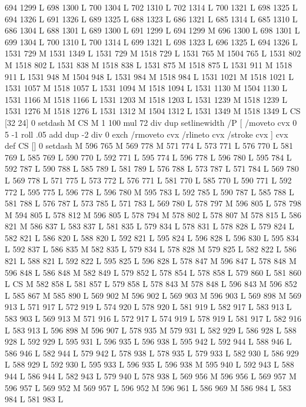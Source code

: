 {{{{{{{{{{{{{{{{{{{{{{{{{{{{{{694 1299 L
698 1300 L
700 1304 L
702 1310 L
702 1314 L
700 1321 L
698 1325 L
694 1326 L
691 1326 L
689 1325 L
688 1323 L
686 1321 L
685 1314 L
685 1310 L
686 1304 L
688 1301 L
689 1300 L
691 1299 L
694 1299 M 696 1300 L
698 1301 L
699 1304 L
700 1310 L
700 1314 L
699 1321 L
698 1323 L
696 1325 L
694 1326 L
1531 729 M 1531 1349 L
1531 729 M 1518 729 L
1531 765 M 1504 765 L
1531 802 M 1518 802 L
1531 838 M 1518 838 L
1531 875 M 1518 875 L
1531 911 M 1518 911 L
1531 948 M 1504 948 L
1531 984 M 1518 984 L
1531 1021 M 1518 1021 L
1531 1057 M 1518 1057 L
1531 1094 M 1518 1094 L
1531 1130 M 1504 1130 L
1531 1166 M 1518 1166 L
1531 1203 M 1518 1203 L
1531 1239 M 1518 1239 L
1531 1276 M 1518 1276 L
1531 1312 M 1504 1312 L
1531 1349 M 1518 1349 L
CS [32 24] 0 setdash M
CS M 1 100 mul 72 div dup setlinewidth
/P [ /moveto cvx 0 5 -1 roll .05 add dup -2 div 0 exch /rmoveto cvx /rlineto cvx /stroke cvx ] cvx def
CS [] 0 setdash M
596 765 M 569 778 M 571 774 L
573 771 L
576 770 L
581 769 L
585 769 L
590 770 L
592 771 L
595 774 L
596 778 L
596 780 L
595 784 L
592 787 L
590 788 L
585 789 L
581 789 L
576 788 L
573 787 L
571 784 L
569 780 L
569 778 L
571 775 L
573 772 L
576 771 L
581 770 L
585 770 L
590 771 L
592 772 L
595 775 L
596 778 L
596 780 M 595 783 L
592 785 L
590 787 L
585 788 L
581 788 L
576 787 L
573 785 L
571 783 L
569 780 L
578 797 M 596 805 L
578 798 M 594 805 L
578 812 M 596 805 L
578 794 M 578 802 L
578 807 M 578 815 L
586 821 M 586 837 L
583 837 L
581 835 L
579 834 L
578 831 L
578 828 L
579 824 L
582 821 L
586 820 L
588 820 L
592 821 L
595 824 L
596 828 L
596 830 L
595 834 L
592 837 L
586 835 M 582 835 L
579 834 L
578 828 M 579 825 L
582 822 L
586 821 L
588 821 L
592 822 L
595 825 L
596 828 L
578 847 M 596 847 L
578 848 M 596 848 L
586 848 M 582 849 L
579 852 L
578 854 L
578 858 L
579 860 L
581 860 L
CS M
582 858 L
581 857 L
579 858 L
578 843 M 578 848 L
596 843 M 596 852 L
585 867 M 585 890 L
569 902 M 596 902 L
569 903 M 596 903 L
569 898 M 569 913 L
571 917 L
572 919 L
574 920 L
578 920 L
581 919 L
582 917 L
583 913 L
583 903 L
569 913 M 571 916 L
572 917 L
574 919 L
578 919 L
581 917 L
582 916 L
583 913 L
596 898 M 596 907 L
578 935 M 579 931 L
582 929 L
586 928 L
588 928 L
592 929 L
595 931 L
596 935 L
596 938 L
595 942 L
592 944 L
588 946 L
586 946 L
582 944 L
579 942 L
578 938 L
578 935 L
579 933 L
582 930 L
586 929 L
588 929 L
592 930 L
595 933 L
596 935 L
596 938 M 595 940 L
592 943 L
588 944 L
586 944 L
582 943 L
579 940 L
578 938 L
569 956 M 596 956 L
569 957 M 596 957 L
569 952 M 569 957 L
596 952 M 596 961 L
586 969 M 586 984 L
583 984 L
581 983 L
}}}}}}}}}}}}}}}}}}}}}}}}}}}}}}

